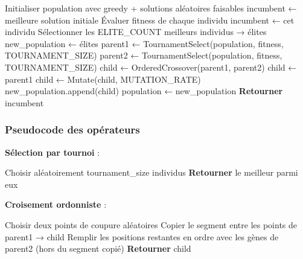 \documentclass[11pt,a4paper]{article}
\begin{document}
\begin{algorithm}[H]
\caption{Algorithme Génétique pour l'OP}
\begin{algorithmic}[1]
\State Initialiser population avec greedy + solutions aléatoires faisables
\State incumbent ← meilleure solution initiale
    \State Évaluer fitness de chaque individu
            \State incumbent ← cet individu
        \EndIf
    \EndFor
    \State Sélectionner les ELITE\_COUNT meilleurs individus → élites
    \State new\_population ← élites
        \State parent1 ← TournamentSelect(population, fitness, TOURNAMENT\_SIZE)
        \State parent2 ← TournamentSelect(population, fitness, TOURNAMENT\_SIZE)
            \State child ← OrderedCrossover(parent1, parent2)
        \Else
            \State child ← parent1
        \EndIf
        \State child ← Mutate(child, MUTATION\_RATE)
        \State new\_population.append(child)
    \EndWhile
    \State population ← new\_population
\EndFor
\State \textbf{Retourner} incumbent
\end{algorithmic}
\end{algorithm}

\subsubsection*{Pseudocode des opérateurs}

\textbf{Sélection par tournoi} :
\begin{algorithm}[H]
\caption{Tournament Selection}
\begin{algorithmic}[1]
    \State Choisir aléatoirement tournament\_size individus
    \State \textbf{Retourner} le meilleur parmi eux
\EndFunction
\end{algorithmic}
\end{algorithm}

\textbf{Croisement ordonniste} :
\begin{algorithm}[H]
\caption{Ordered Crossover (OX)}
\begin{algorithmic}[1]
    \State Choisir deux points de coupure aléatoires
    \State Copier le segment entre les points de parent1 → child
    \State Remplir les positions restantes en ordre avec les gènes de parent2 (hors du segment copié)
    \State \textbf{Retourner} child
\EndFunction
\end{algorithmic}
\end{algorithm}
\end{document}
